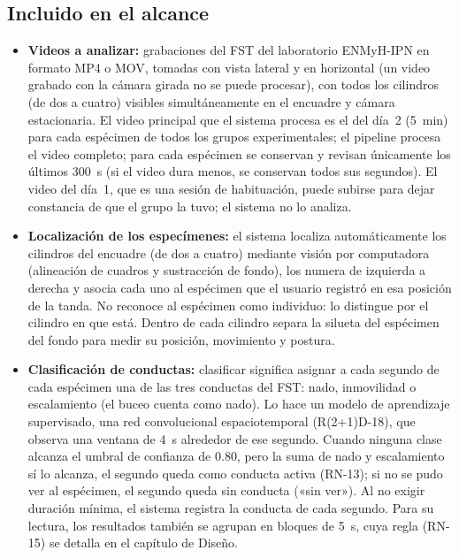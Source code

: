 \subsection*{Incluido en el alcance}
\begin{itemize}
  \item \textbf{Videos a analizar:} grabaciones del FST del laboratorio ENMyH-IPN en
        formato MP4 o MOV, tomadas con vista lateral y en horizontal (un video grabado con
        la cámara girada no se puede procesar), con todos los cilindros (de dos a cuatro)
        visibles simultáneamente en el encuadre y cámara estacionaria. El video principal que
        el sistema procesa es el del día~2 (5~min) para cada espécimen de todos los
        grupos experimentales; el pipeline procesa el video completo; para cada espécimen se conservan y revisan únicamente los últimos 300~s
        (si el video dura menos, se conservan todos sus segundos). El video del día~1, que es una sesión de
        habituación, puede subirse para dejar constancia de que el grupo la tuvo; el sistema no
        lo analiza.

  \item \textbf{Localización de los especímenes:} el sistema localiza automáticamente
        los cilindros del encuadre (de dos a cuatro) mediante visión por computadora (alineación de cuadros y sustracción de fondo), los
        numera de izquierda a derecha y asocia cada uno al espécimen que el usuario
        registró en esa posición de la tanda. No reconoce al espécimen como individuo:
        lo distingue por el cilindro en que está. Dentro de cada cilindro separa la
        silueta del espécimen del fondo para medir su posición, movimiento y postura.

  \item \textbf{Clasificación de conductas:} clasificar significa asignar a cada
        segundo de cada espécimen una de las tres conductas del FST: nado, inmovilidad
        o escalamiento (el buceo cuenta como nado). Lo hace un modelo de aprendizaje
        supervisado, una red convolucional espaciotemporal (R(2+1)D-18), que observa una ventana de 4~s alrededor de ese segundo. Cuando
        ninguna clase alcanza el umbral de confianza de 0.80, pero la suma de nado y
        escalamiento sí lo alcanza, el segundo queda como conducta activa (RN-13); si no
        se pudo ver al espécimen, el segundo queda sin conducta («sin ver»). Al no exigir
        duración mínima, el sistema registra la conducta de cada segundo. Para
        su lectura, los resultados también se agrupan en bloques de 5~s, cuya regla
        (RN-15) se detalla en el capítulo de Diseño.


\end{itemize}
